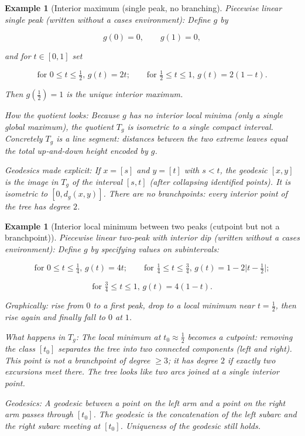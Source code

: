 \documentclass[11pt]{article}
\newtheorem{example}[definition]{Example}
\begin{document}
\begin{example}[Interior maximum (single peak, no branching]
Piecewise linear single peak (written without a cases environment):
Define \(g\) by


\[
g(0)=0,\qquad g(1)=0,
\]


and for \(t\in[0,1]\) set


\[
\text{for }0\le t\le \tfrac{1}{2}\text{, } g(t)=2t;\qquad
\text{for }\tfrac{1}{2}\le t\le 1\text{, } g(t)=2(1-t).
\]


Then \(g(\tfrac{1}{2})=1\) is the unique interior maximum.

How the quotient looks:
Because \(g\) has no interior local minima (only a single global maximum), the quotient \(T_g\) is isometric to a single compact interval. Concretely \(T_g\) is a line segment: distances between the two extreme leaves equal the total up‑and‑down height encoded by \(g\).

Geodesics made explicit:
If \(x=[s]\) and \(y=[t]\) with \(s<t\), the geodesic \([x,y]\) is the image in \(T_g\) of the interval \([s,t]\) (after collapsing identified points). It is isometric to \([0,d_g(x,y)]\). There are no branchpoints: every interior point of the tree has degree \(2\).
\end{example}
\begin{example} [Interior local minimum between two peaks (cutpoint but not a branchpoint)]
Piecewise linear two‑peak with interior dip (written without a cases environment):
Define \(g\) by specifying values on subintervals:


\[
\text{for }0\le t\le \tfrac{1}{4}\text{, } g(t)=4t;
\qquad
\text{for }\tfrac{1}{4}\le t\le \tfrac{3}{4}\text{, } g(t)=1-2\bigl|t-\tfrac{1}{2}\bigr|;
\]




\[
\text{for }\tfrac{3}{4}\le t\le 1\text{, } g(t)=4(1-t).
\]


Graphically: rise from \(0\) to a first peak, drop to a local minimum near \(t=\tfrac{1}{2}\), then rise again and finally fall to \(0\) at \(1\).

What happens in \(T_g\):
The local minimum at \(t_0\approx\tfrac{1}{2}\) becomes a cutpoint: removing the class \([t_0]\) separates the tree into two connected components (left and right). This point is not a branchpoint of degree \(\ge 3\); it has degree \(2\) if exactly two excursions meet there. The tree looks like two arcs joined at a single interior point.

Geodesics:
A geodesic between a point on the left arm and a point on the right arm passes through \([t_0]\). The geodesic is the concatenation of the left subarc and the right subarc meeting at \([t_0]\). Uniqueness of the geodesic still holds.
\end{example}
\end{document}
